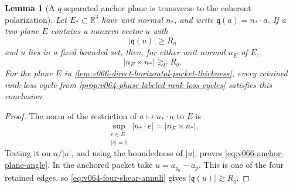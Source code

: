 \documentclass[10pt]{article}
\newtheorem{lemma}[theorem]{Lemma}
\begin{document}
\begin{lemma}[A \(q\)-separated anchor plane is transverse to the coherent polarization]
\label{lem:v066-anchor-plane-q-transverse}
Let \(E_*\subset\mathbb R^3\) have unit normal \(n_*\), and write
\(\mathfrak q(a)=n_*\cdot a\).  If a two-plane \(E\) contains a nonzero vector \(u\) with
\[
|\mathfrak q(u)|\ge R_q
\]
and \(u\) lies in a fixed bounded set, then, for either unit normal \(n_E\) of \(E\),
\begin{equation}
\label{eq:v066-anchor-plane-angle}
\boxed{
|n_E\times n_*|
\gtrsim_U R_q.
}
\end{equation}
For the plane \(E\) in
\cref{lem:v066-direct-horizontal-packet-thickness}, every retained rank-loss cycle from
\cref{prop:v064-phase-labeled-rank-loss-cycles} satisfies this conclusion.
\end{lemma}

\begin{proof}
The norm of the restriction of \(a\mapsto n_*\cdot a\) to \(E\) is
\[
\sup_{\substack{e\in E\\|e|=1}}|n_*\cdot e|
=|n_E\times n_*|.
\]
Testing it on \(u/|u|\), and using the boundedness of \(|u|\), proves
\eqref{eq:v066-anchor-plane-angle}.  In the anchored packet take
\(u=a_{y_0}-a_p\).  This is one of the four retained edges, so
\eqref{eq:v064-four-shear-annuli} gives
\(|\mathfrak q(u)|\gtrsim R_q\).
\end{proof}
\end{document}
